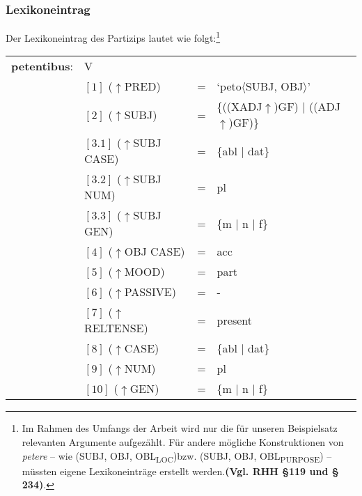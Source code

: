 \documentclass[12pt,a4paper]{article}
\begin{document}
\subsubsection{Lexikoneintrag}
Der Lexikoneintrag des Partizips lautet wie folgt:\footnote{Im Rahmen des Umfangs der Arbeit wird nur die für unseren Beispielsatz relevanten Argumente aufgezählt. Für andere mögliche Konstruktionen von \textit{petere} -- wie (SUBJ, OBJ, OBL\textsubscript{LOC})bzw. (SUBJ, OBJ, OBL\textsubscript{PURPOSE}) -- müssten eigene Lexikoneinträge erstellt werden.\textbf{(Vgl. RHH §119 und § 234)}.}
\begin{singlespace}
\begin{tabular}{ l  l  l  l  } 
\textbf{petentibus}: & V \\
$\qquad$ & $[1]$ \:  ($\uparrow$PRED) & = & `peto$\langle$SUBJ, OBJ$\rangle$' \\
$\qquad$ & $[2]$ \:  ($\uparrow$SUBJ) & = & \{((XADJ$\uparrow$)GF) $\mid$ ((ADJ$\uparrow$)GF)\} \\
$\qquad$ & $[3.1]$ \:  ($\uparrow$SUBJ CASE) & = & \{abl $\mid$ dat\} \\
$\qquad$ & $[3.2]$ \:  ($\uparrow$SUBJ NUM) & = & pl \\
$\qquad$ & $[3.3]$ \:  ($\uparrow$SUBJ GEN) & = & \{m $\mid$ n $\mid$ f\} \\
$\qquad$ & $[4]$ \:  ($\uparrow$OBJ CASE) & = & acc \\
$\qquad$ & $[5]$ \:  ($\uparrow$MOOD) & = & part\\
$\qquad$ & $[6]$ \:  ($\uparrow$PASSIVE) & = & - \\
$\qquad$ & $[7]$ \:  ($\uparrow$RELTENSE) & = & present \\ 
$\qquad$ & $[8]$ \:  ($\uparrow$CASE) & = & \{abl $\mid$ dat\} \\
$\qquad$ & $[9]$ \:  ($\uparrow$NUM) & = & pl \\
$\qquad$ & $[10]$ \:  ($\uparrow$GEN) & = & \{m $\mid$ n $\mid$ f\} \\
\end{tabular}
\newline
\newline
\end{singlespace}
\end{document}
